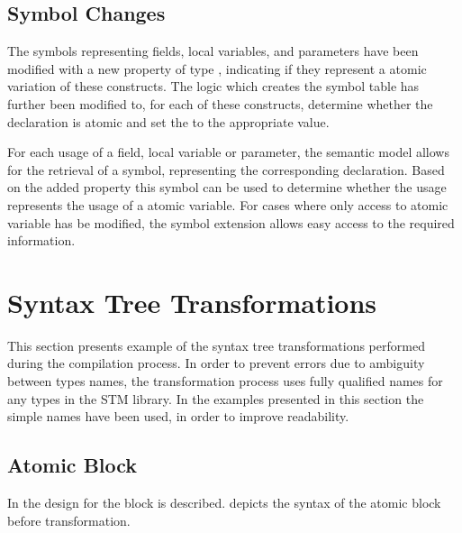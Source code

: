 \subsection{Symbol Changes}
The symbols representing fields, local variables, and parameters have been modified with a new  property of type , indicating if they represent a atomic variation of these constructs. The logic which creates the symbol table has further been modified to, for each of these constructs, determine whether the declaration is atomic and set the  to the appropriate value.

For each usage of a field, local variable or parameter, the semantic model allows for the retrieval of a symbol, representing the corresponding declaration. Based on the added  property this symbol can be used to determine whether the usage represents the usage of a atomic variable. For cases where only access to atomic variable has be modified, the symbol extension allows easy access to the required information.


\section{Syntax Tree Transformations}
\label{sec:syntax_tree_transformations}
This section presents example of the syntax tree transformations performed during the compilation process. In order to prevent errors due to ambiguity between types names, the transformation process uses fully qualified names\cite[p. 73]{csharp2013specificaiton}  for any types in the \ac{STM} library. In the examples presented in this section the simple names have been used, in order to improve readability. 

\subsection{Atomic Block}
In  the design for the  block is described.  depicts the syntax of the atomic block before transformation. 

